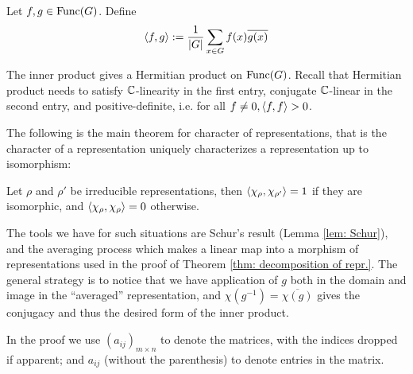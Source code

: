 \begin{definition}
    Let $f, g \in \mathrm{Func}(G)$. Define 
    \[
        \left\langle f, g \right\rangle := \frac{1}{\left|G\right|} \sum_{x \in G} f(x) \overline{g(x)}
    \]
\end{definition}

\begin{remark}
    The inner product gives a Hermitian product on $\mathrm{Func}(G)$. Recall that Hermitian product needs to satisfy $\mathbb{C}$-linearity in the first entry, conjugate $\mathbb{C}$-linear in the second entry, and positive-definite, i.e. for all $f \neq 0, \left\langle f, f \right\rangle > 0$.
\end{remark}

\textstart
The following is the main theorem for character of representations, that is the character of a representation uniquely characterizes a representation up to isomorphism:

\begin{theorem}\label{thm: inner product of irred repr.}
    Let $\rho$ and $\rho'$ be irreducible representations, then $\left\langle \chi_{\rho}, \chi_{\rho'} \right\rangle = 1$ if they are isomorphic, and $\left\langle \chi_{\rho}, \chi_{\rho} \right\rangle = 0$ otherwise.
\end{theorem}

\textstart
The tools we have for such situations are Schur's result (Lemma \ref{lem: Schur}), and the averaging process which makes a linear map into a morphism of representations used in the proof of Theorem \ref{thm: decomposition of repr.}. The general strategy is to notice that we have application of $g$ both in the domain and image in the ``averaged'' representation, and $\chi(g^{-1}) = \overline{\chi(g)}$ gives the conjugacy and thus the desired form of the inner product.

\begin{notation}
    In the proof we use $(a_{ij})_{m \times n}$ to denote the matrices, with the indices dropped if apparent; and $a_{ij}$ (without the parenthesis) to denote entries in the matrix. 
\end{notation}

